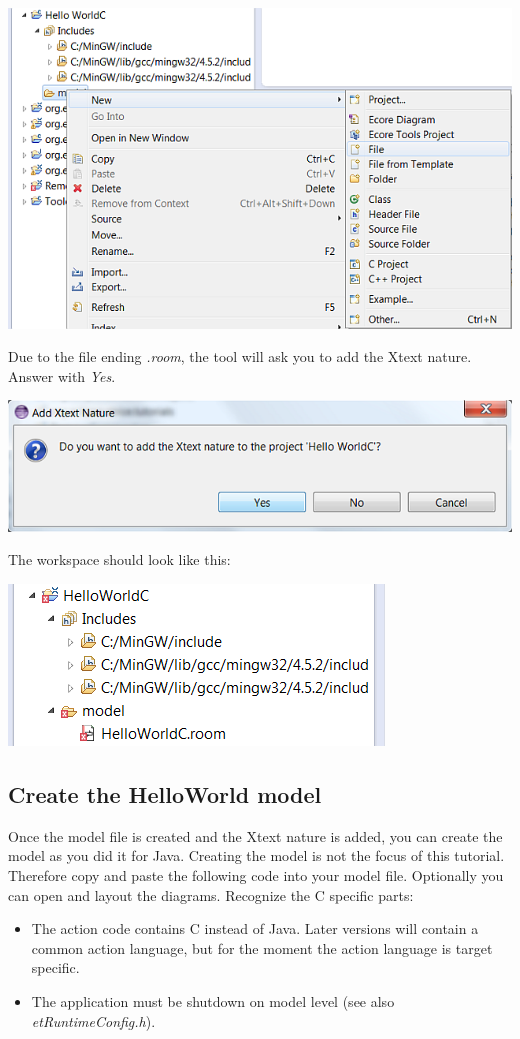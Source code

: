 \includegraphics{images/016-HelloWorldC03.png}

Due to the file ending \textit{.room}, the tool will ask you to add the Xtext nature. Answer with 
\textit{Yes}. 

\includegraphics{images/016-HelloWorldC04.png}

The workspace should look like this:

\includegraphics{images/016-HelloWorldC05.png}



\subsection{Create the HelloWorld model}

Once the model file is created and the Xtext nature is added, you can create the model as you did it for 
Java.
Creating the model is not the focus of this tutorial. Therefore copy and paste the following code into 
your model file. Optionally you can open and layout the diagrams.  
Recognize the C specific parts:
\begin{itemize}
\item The action code contains C instead of Java. Later versions will contain a common action language, 
but for the moment the action language is target specific.
\item The application must be shutdown on model level (see also \textit{etRuntimeConfig.h}).  
\end{itemize}

